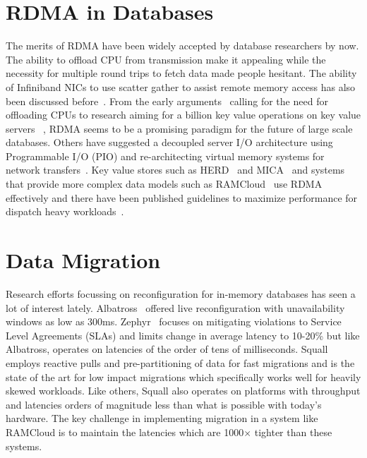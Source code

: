 \section{RDMA in Databases}
The merits of RDMA have been widely accepted by database researchers by now. The 
ability to offload CPU from transmission make it appealing while the necessity for 
multiple round trips to fetch data made people hesitant. The ability of Infiniband NICs to 
use scatter gather to assist remote memory access has also been discussed before~\cite{zerocopy04}.
From the early arguments~\cite{rdmacase} calling for the need for offloading CPUs to 
research aiming for a billion key value operations on key value servers ~\cite{rdmabillion},
RDMA seems to be a promising paradigm for the future of large scale databases. Others have suggested
a decoupled server I/O architecture using Programmable I/O (PIO) and re-architecting virtual 
memory systems for network transfers~\cite{hicamp}. Key value stores
such as HERD~\cite{herd} and MICA~\cite{mica} and systems that provide more complex
data models such as RAMCloud~\cite{ramcloud} use RDMA effectively and there have been 
published guidelines to maximize performance for dispatch heavy workloads~\cite{rdma}.

\section{Data Migration}
Research efforts focussing on reconfiguration for in-memory databases has seen a lot of 
interest lately. Albatross~\cite{albatross} offered live reconfiguration with unavailability windows as low as 
300ms. Zephyr~\cite{zephyr} focuses on mitigating violations to Service Level Agreements (SLAs) and limits 
change in average latency to 10-20\% but like Albatross, operates on latencies of the order of tens of milliseconds.  
Squall~\cite{squall} employs reactive pulls and pre-partitioning
of data for fast migrations and is the state of the art for low impact migrations which specifically works well for 
heavily skewed workloads. Like others, Squall also operates on platforms with throughput and latencies orders of 
magnitude less than what is possible with today's hardware. The key challenge in implementing migration in a system 
like RAMCloud is to maintain the latencies which are 1000$\times$ tighter than these systems.

